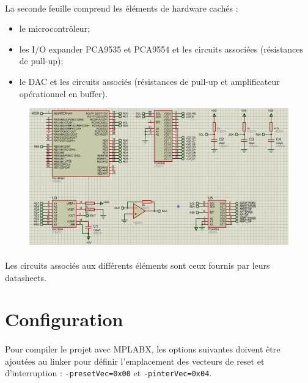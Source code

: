 \documentclass{article}
\begin{document}
    \paragraph{}
    La seconde feuille comprend les éléments de hardware cachés :
    \begin{itemize}[label=$\bullet$]
        \item le microcontrôleur;
        \item les I/O expander PCA9535 et PCA9554 et les circuits associées (résistances de pull-up);
        \item le DAC et les circuits associés (résistances de pull-up et amplificateur opérationnel en buffer).
    \end{itemize}

    \begin{figure}[H]
        \centering
        \includegraphics[width=\textwidth]{./images/proteus_rs2.png}
    \end{figure}

    \paragraph{}
    Les circuits associés aux différents éléments sont ceux fournis par leurs datasheets.



    \section{Configuration}
    \paragraph{}
    Pour compiler le projet avec MPLABX, les options suivantes doivent être ajoutées au linker pour définir l'emplacement des vecteurs de reset et d'interruption : \texttt{-presetVec=0x00} et \texttt{-pinterVec=0x04}.
\end{document}
